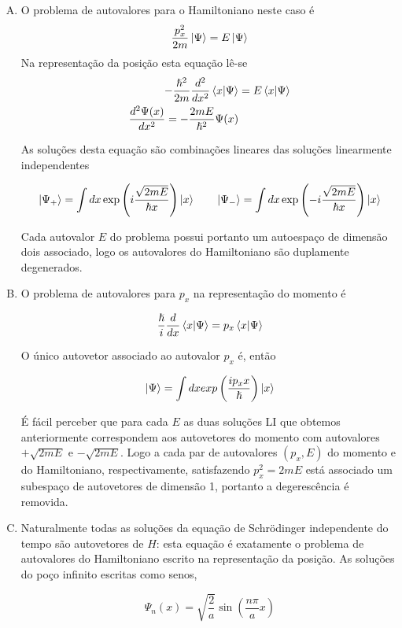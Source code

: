 \documentclass[a4paper, 12pt, notitlepage]{article}
\begin{document}
\begin{enumerate}
\begin{enumerate}[(A)]
  \item O problema de autovalores para o Hamiltoniano neste caso é
  \[
    \frac{p_x^2}{2m} \ket{\Psi} = E\ket{\Psi}
  \]
  Na representação da posição esta equação lê-se
  \begin{align*}
    -\frac{\hslash^2}{2m} \frac{d^2}{dx^2} \bra{x}\ket{\Psi} &= E \bra{x} \ket{\Psi} \\
    \frac{d^2\Psi(x)}{dx^2} = -\frac{2mE}{\hslash^2} \Psi(x)
  \end{align*}
  
  As soluções desta equação são combinações lineares das soluções linearmente independentes
  
  \begin{equation*}
    \ket{\Psi_+} =  \int dx \exp\left(i\frac{\sqrt{2mE}}{\hslash x}\right) \ket{x} \qquad \ket{\Psi_-} =  \int dx \exp\left(-i\frac{\sqrt{2mE}}{\hslash x}\right)\ket{x} 
  \end{equation*}
  
  Cada autovalor $E$ do problema possui portanto um autoespaço de dimensão dois associado, logo os autovalores do Hamiltoniano são duplamente degenerados.
  
  \item O problema de autovalores para $p_x$ na representação do momento é
  
  \[
    \frac{\hslash}{i} \frac{d}{dx} \bra{x}\ket{\Psi} = p_x \bra{x}\ket{\Psi}
  \]
  
  O único autovetor associado ao autovalor $p_x$ é, então
  
  \[
    \ket{\Psi} = \int dx exp\left(\frac{ip_x x}{\hslash}\right) \ket{x}
  \]
  
  É fácil perceber que para cada $E$ as duas soluções LI que obtemos anteriormente correspondem aos autovetores do momento com autovalores $+\sqrt{2mE}$ e $-\sqrt{2mE}$. Logo a cada par de autovalores $(p_x, E)$ do momento e do Hamiltoniano, respectivamente, satisfazendo $p_x^2 = 2mE$ está associado um subespaço de autovetores de dimensão 1, portanto a degerescência é removida.
  
  \item Naturalmente todas as soluções da equação de Schrödinger independente do tempo são autovetores de $H$: esta equação é exatamente o problema de autovalores do Hamiltoniano escrito na representação da posição. As soluções do poço infinito escritas como senos,
  
  \[
    \Psi_n(x) = \sqrt{\frac{2}{a}} \sin\left(\frac{n\pi}{a}x\right)
  \]
  

\end{enumerate}
\end{enumerate}
\end{document}
